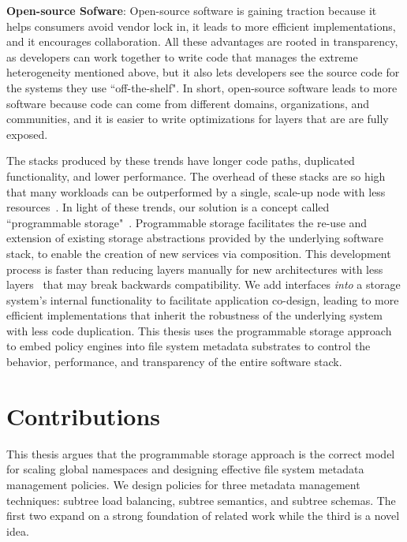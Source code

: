 \textbf{Open-source Sofware}: Open-source software is gaining traction because
it helps consumers avoid vendor lock in, it leads to more efficient
implementations, and it encourages collaboration. All these advantages are
rooted in transparency, as developers can work together to write code that
manages the extreme heterogeneity mentioned above, but it also lets developers
see the source code for the systems they use ``off-the-shelf". In short,
open-source software leads to more software because code can come from
different domains, organizations, and communities, and it is easier to write
optimizations for layers that are are fully exposed.

The stacks produced by these trends have longer code paths, duplicated
functionality, and lower performance.  The overhead of these stacks are so
high that many workloads can be outperformed by a single, scale-up node with
less resources~\cite{sevilla:discs2013-framework,
rowstron:hotcdp2012-hadoop-vs-single-node, schwarzkopf:hotcloud2012-7-sins,
gigaspaces:whitepaper2011-su-vs-so, michael:2007pdps-scale-up-x-scale-out}.  In
light of these trends, our solution is a concept called ``programmable
storage"~\cite{sevilla:eurosys17-malacology, watkins:hot17-declstor}.
Programmable storage facilitates the re-use and extension of existing storage
abstractions provided by the underlying software stack, to enable the creation
of new services via composition. This development process is faster than
reducing layers manually for new architectures with less
layers~\cite{bent:login16-hpc-trends} that may break backwards compatibility.
We add interfaces {\it into} a storage system's internal functionality to
facilitate application co-design, leading to more efficient implementations
that inherit the robustness of the underlying system with less code
duplication. This thesis uses the programmable storage approach to embed policy
engines into file system metadata substrates to control the behavior,
performance, and transparency of the entire software stack.

\section{Contributions}

This thesis argues that the programmable storage approach is the correct model
for scaling global namespaces and designing effective file system
metadata management policies. We design policies for three metadata management
techniques: subtree load balancing, subtree semantics, and subtree schemas.
The first two expand on a strong foundation of related work while the third is
a novel idea.

